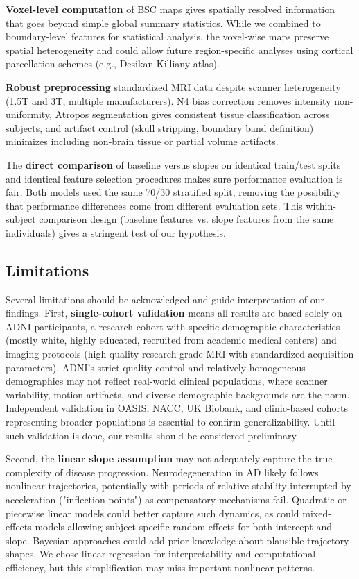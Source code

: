 \documentclass[blue]{ludusofficial}  %
\begin{document}
\textbf{Voxel-level computation} of BSC maps gives spatially resolved information that goes beyond simple global summary statistics. While we combined to boundary-level features for statistical analysis, the voxel-wise maps preserve spatial heterogeneity and could allow future region-specific analyses using cortical parcellation schemes (e.g., Desikan-Killiany atlas).

\textbf{Robust preprocessing} standardized MRI data despite scanner heterogeneity (1.5T and 3T, multiple manufacturers). N4 bias correction removes intensity non-uniformity, Atropos segmentation gives consistent tissue classification across subjects, and artifact control (skull stripping, boundary band definition) minimizes including non-brain tissue or partial volume artifacts.

The \textbf{direct comparison} of baseline versus slopes on identical train/test splits and identical feature selection procedures makes sure performance evaluation is fair. Both models used the same 70/30 stratified split, removing the possibility that performance differences come from different evaluation sets. This within-subject comparison design (baseline features vs. slope features from the same individuals) gives a stringent test of our hypothesis.

\subsection{Limitations}

Several limitations should be acknowledged and guide interpretation of our findings. First, \textbf{single-cohort validation} means all results are based solely on ADNI participants, a research cohort with specific demographic characteristics (mostly white, highly educated, recruited from academic medical centers) and imaging protocols (high-quality research-grade MRI with standardized acquisition parameters). ADNI's strict quality control and relatively homogeneous demographics may not reflect real-world clinical populations, where scanner variability, motion artifacts, and diverse demographic backgrounds are the norm. Independent validation in OASIS, NACC, UK Biobank, and clinic-based cohorts representing broader populations is essential to confirm generalizability. Until such validation is done, our results should be considered preliminary.

Second, the \textbf{linear slope assumption} may not adequately capture the true complexity of disease progression. Neurodegeneration in AD likely follows nonlinear trajectories, potentially with periods of relative stability interrupted by acceleration ("inflection points") as compensatory mechanisms fail. Quadratic or piecewise linear models could better capture such dynamics, as could mixed-effects models allowing subject-specific random effects for both intercept and slope. Bayesian approaches could add prior knowledge about plausible trajectory shapes. We chose linear regression for interpretability and computational efficiency, but this simplification may miss important nonlinear patterns.
\end{document}
